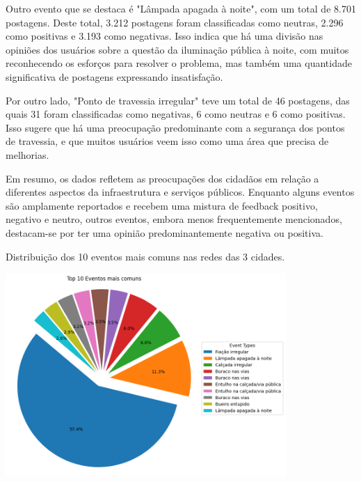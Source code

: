 Outro evento que se destaca é "Lâmpada apagada à noite", com um total de 8.701 postagens. Deste total, 3.212 postagens foram classificadas como neutras, 2.296 como positivas e 3.193 como negativas. Isso indica que há uma divisão nas opiniões dos usuários sobre a questão da iluminação pública à noite, com muitos reconhecendo os esforços para resolver o problema, mas também uma quantidade significativa de postagens expressando insatisfação.

Por outro lado, "Ponto de travessia irregular" teve um total de 46 postagens, das quais 31 foram classificadas como negativas, 6 como neutras e 6 como positivas. Isso sugere que há uma preocupação predominante com a segurança dos pontos de travessia, e que muitos usuários veem isso como uma área que precisa de melhorias.

Em resumo, os dados refletem as preocupações dos cidadãos em relação a diferentes aspectos da infraestrutura e serviços públicos. Enquanto alguns eventos são amplamente reportados e recebem uma mistura de feedback positivo, negativo e neutro, outros eventos, embora menos frequentemente mencionados, destacam-se por ter uma opinião predominantemente negativa ou positiva.

\begin{quadro}[!htb]
	\caption{Distribuição dos 10 eventos mais comuns nas redes das 3 cidades.}
	\label{fig:pie_most_common_events}
	\centering
	\includegraphics[width=0.8\textwidth]{images/pie_most_common_events.png}
	\fautor
\end{quadro}

